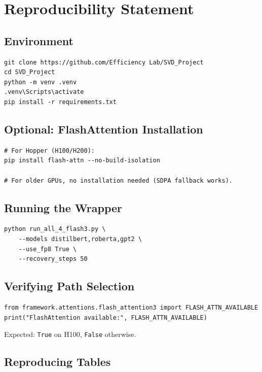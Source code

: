 \section{Reproducibility Statement}

\subsection{Environment}

\begin{lstlisting}
git clone https://github.com/Efficiency Lab/SVD_Project
cd SVD_Project
python -m venv .venv
.venv\Scripts\activate
pip install -r requirements.txt
\end{lstlisting}

\subsection{Optional: FlashAttention Installation}

\begin{lstlisting}
# For Hopper (H100/H200):
pip install flash-attn --no-build-isolation

# For older GPUs, no installation needed (SDPA fallback works).
\end{lstlisting}

\subsection{Running the Wrapper}

\begin{lstlisting}
python run_all_4_flash3.py \
    --models distilbert,roberta,gpt2 \
    --use_fp8 True \
    --recovery_steps 50
\end{lstlisting}

\subsection{Verifying Path Selection}

\begin{lstlisting}
from framework.attentions.flash_attention3 import FLASH_ATTN_AVAILABLE
print("FlashAttention available:", FLASH_ATTN_AVAILABLE)
\end{lstlisting}

Expected: \texttt{True} on H100, \texttt{False} otherwise.

\subsection{Reproducing Tables}

